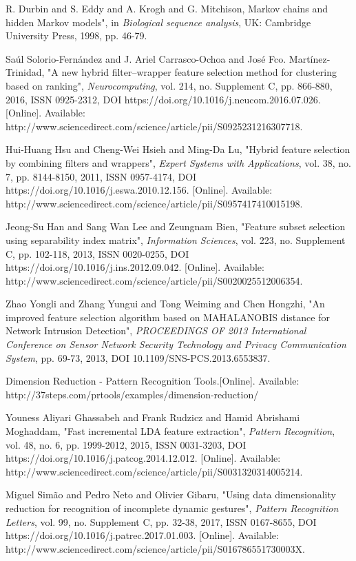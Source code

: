 \begin{thebibliography}{5}
 R. Durbin and S. Eddy and A. Krogh and G. Mitchison, Markov chains and hidden Markov models", in \emph{Biological sequence analysis}, UK: Cambridge University Press, 1998, pp. 46-79.

 Saúl Solorio-Fernández and J. Ariel Carrasco-Ochoa and José Fco. Martínez-Trinidad, "A new hybrid filter–wrapper feature selection method for clustering based on ranking", \emph{Neurocomputing}, vol. 214, no. Supplement C, pp. 866-880, 2016, ISSN 0925-2312, DOI https://doi.org/10.1016/j.neucom.2016.07.026. [Online]. Available: http://www.sciencedirect.com/science/article/pii/S0925231216307718. 

 Hui-Huang Hsu and Cheng-Wei Hsieh and Ming-Da Lu, "Hybrid feature selection by combining filters and wrappers", \emph{Expert Systems with Applications}, vol. 38, no. 7, pp. 8144-8150, 2011, ISSN 0957-4174, DOI https://doi.org/10.1016/j.eswa.2010.12.156. [Online]. Available: http://www.sciencedirect.com/science/article/pii/S0957417410015198. 

 Jeong-Su Han and Sang Wan Lee and Zeungnam Bien, "Feature subset selection using separability index matrix", \emph{Information Sciences}, vol. 223, no. Supplement C, pp. 102-118, 2013, ISSN 0020-0255, DOI https://doi.org/10.1016/j.ins.2012.09.042. [Online]. Available: http://www.sciencedirect.com/science/article/pii/S0020025512006354. 

 Zhao Yongli and Zhang Yungui and Tong Weiming and Chen Hongzhi, "An improved feature selection algorithm based on MAHALANOBIS distance for Network Intrusion Detection", \emph{PROCEEDINGS OF 2013 International Conference on Sensor Network Security Technology and Privacy Communication System}, pp. 69-73, 2013, DOI 10.1109/SNS-PCS.2013.6553837.

 Dimension Reduction - Pattern Recognition Tools.[Online]. Available: http://37steps.com/prtools/examples/dimension-reduction/

 Youness Aliyari Ghassabeh and Frank Rudzicz and Hamid Abrishami Moghaddam, "Fast incremental LDA feature extraction", \emph{Pattern Recognition}, vol. 48, no. 6, pp. 1999-2012, 2015, ISSN 0031-3203, DOI https://doi.org/10.1016/j.patcog.2014.12.012. [Online]. Available: http://www.sciencedirect.com/science/article/pii/S0031320314005214.

 Miguel Simão and Pedro Neto and Olivier Gibaru, "Using data dimensionality reduction for recognition of incomplete dynamic gestures", \emph{Pattern Recognition Letters}, vol. 99, no. Supplement C, pp. 32-38, 2017, ISSN 0167-8655, DOI https://doi.org/10.1016/j.patrec.2017.01.003. [Online]. Available: http://www.sciencedirect.com/science/article/pii/S016786551730003X.


\end{thebibliography}
